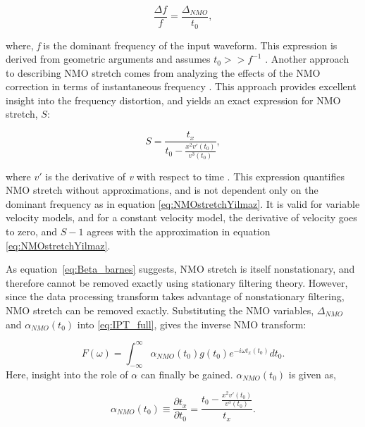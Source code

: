 \begin{equation}
  \frac{\Delta f}{f}=\frac{\Delta _{NMO}}{t_0},
\label{eq:NMOstretchYilmaz}
\end{equation}

\noindent where, \textit{f} is the dominant frequency of the input waveform.  This expression is derived from geometric arguments and assumes $t_0>>f^{-1}$ \cite{yilmaz01}.  Another approach to describing NMO stretch comes from analyzing the effects of the NMO correction in terms of instantaneous frequency \cite{barnes92}.  This approach provides excellent insight into the frequency distortion, and yields an exact expression for NMO stretch, $S$:

\begin{equation}
S=\frac{t_x}{t_0-\frac{x^2v'\left(t_0\right)}{v^3\left(t_0\right)}},
\label{eq:Beta_barnes}
\end{equation}

\noindent where $v'$ is the derivative of \textit{v} with respect to time \cite{barnes92}.  This expression quantifies NMO stretch without approximations, and is not dependent only on the dominant frequency as in equation \ref{eq:NMOstretchYilmaz}.  It is valid for variable velocity models, and for a constant velocity model, the derivative of velocity goes to zero, and $S-1$ agrees with the approximation in equation \ref{eq:NMOstretchYilmaz}.  

As equation~\ref{eq:Beta_barnes} suggests, NMO stretch is itself nonstationary, and therefore cannot be removed exactly using stationary filtering theory.  However, since the data processing transform takes advantage of nonstationary filtering, NMO stretch can be removed exactly.  Substituting the NMO variables, $\Delta_{NMO}$ and $\alpha_{NMO}\left( t_0\right) $ into \ref{eq:IPT_full}, gives the inverse NMO transform:

\begin{equation}
F(\omega )=\int _{-\infty }^{\infty }\alpha _{NMO}\left( t_0\right) g\left(t_0\right)e^{-i \omega t_x\left(t_0\right)}dt_0.
\label{eq:INMOT_full}
\end{equation}
Here, insight into the role of $\alpha$ can finally be gained. $\alpha_{NMO}\left( t_0\right) $ is given as,

\begin{equation}
\alpha _{NMO}\left( t_0\right) \equiv \frac{\partial t_x}{\partial t_0}=\frac{t_0-\frac{x^2v'\left(t_0\right)}{v^3\left(t_0\right)}}{t_x}.
\label{eq:Alpha_NMO}
\end{equation}

